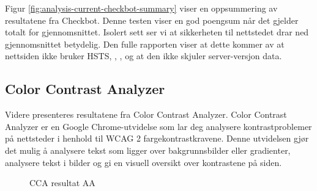  Figur \ref{fig:analysis-current-checkbot-summary} viser en oppsummering av resultatene fra Checkbot. Denne testen viser en god poengsum når det gjelder totalt for gjennomsnittet. Isolert sett ser vi at sikkerheten til nettstedet drar ned gjennomsnittet betydelig. Den fulle rapporten viser at dette kommer av at nettsiden ikke bruker HSTS, , ,  og at den ikke skjuler server-versjon data.

\subsection{Color Contrast Analyzer}
\label{sec:analysis-current-color-contrast-analyzer}
Videre presenteres resultatene fra Color Contrast Analyzer. Color Contrast Analyzer \cite{ncstate2013cca} er en Google Chrome-utvidelse som lar deg analysere kontrastproblemer på nettsteder i henhold til WCAG 2 fargekontrastkravene. Denne utvidelsen gjør det mulig å analysere tekst som ligger over bakgrunnsbilder eller gradienter, analysere tekst i bilder og gi en visuell oversikt over kontrastene på siden.

\begin{figure}[H]
    \centering
    \caption{CCA resultat AA}
    \label{fig:analysis-current-cca-aa}
\end{figure}

